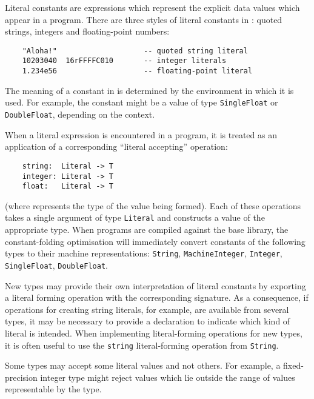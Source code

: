 Literal constants are expressions which represent the explicit data values
which appear in a program.  There are three styles of literal constants
in \asharp{}:  quoted strings, integers and floating-point numbers:

\begin{small}
\begin{verbatim}
    "Aloha!"                    -- quoted string literal
    10203040  16rFFFFC010       -- integer literals
    1.234e56                    -- floating-point literal
\end{verbatim}
\end{small}
The meaning of a constant in \asharp{} is determined by the environment
in which it is used.  For example, the constant  might
be a value of type \verb"SingleFloat" or \verb"DoubleFloat",
depending on the context.

When a literal expression is encountered in a program, it is treated
as an application of a corresponding ``literal accepting''
operation:

\begin{small}
\begin{verbatim}
    string:  Literal -> T
    integer: Literal -> T
    float:   Literal -> T
\end{verbatim}
\end{small}
(where  represents the type of the value being formed).
Each of these operations takes a single argument of type \verb"Literal"
and constructs a value of the appropriate type.  When programs are compiled
against the base \asharp{} library, the constant-folding optimisation
will immediately convert constants of the following types to their machine
representations:  \verb"String", \verb"MachineInteger", \verb"Integer",
\verb"SingleFloat", \verb"DoubleFloat".

New types may provide their own interpretation of literal constants
by exporting a literal forming operation with the corresponding signature.
As a consequence, if operations for creating string literals, for example,
are available from several types, it may be necessary to provide a declaration
to indicate which kind of literal is intended.  When implementing
literal-forming operations for new types, it is often useful to use the
\verb"string" literal-forming operation from \verb"String".

Some types may accept some literal values and not others.
For example, a fixed-precision integer type might reject values
which lie outside the range of values representable by the type.

